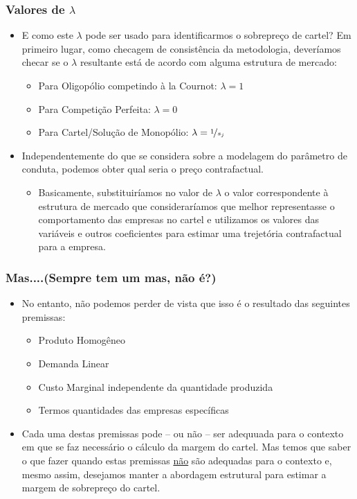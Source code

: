 \documentclass{beamer}
\begin{document}
\begin{frame}\frametitle{Valores de $\lambda$}
\small
\begin{itemize}
\item E como este $\lambda$ pode ser usado para identificarmos
o sobrepreço de cartel? Em primeiro lugar, como checagem de consistência
da metodologia, deveríamos checar se o $\lambda$ resultante está
de acordo com alguma estrutura de mercado:
\begin{itemize}
\item Para Oligopólio competindo à la Cournot: $\lambda=1$
\item Para Competição Perfeita: $\lambda=0$
\item Para Cartel/Solução de Monopólio: $\lambda=\nicefrac{1}{s_{j}}$
\end{itemize}
\item Independentemente do que se considera sobre a modelagem do
parâmetro de conduta, podemos obter qual seria o preço contrafactual.
\begin{itemize}
\item Basicamente, substituiríamos no valor de $\lambda$ o valor
correspondente à estrutura de mercado que consideraríamos que melhor
representasse o comportamento das empresas no cartel e utilizamos
os valores das variáveis e outros coeficientes para estimar uma trejetória
contrafactual para a empresa. 
\end{itemize}
\end{itemize}
\end{frame}

\begin{frame}\frametitle{Mas....(Sempre tem um mas, não é?)}

\begin{itemize}
\item No entanto, não podemos perder de vista que isso é o resultado das
seguintes premissas:

\begin{itemize}
\item Produto Homogêneo
\item Demanda Linear
\item Custo Marginal independente da quantidade produzida
\item Termos quantidades das empresas específicas
\end{itemize}
\item Cada uma destas premissas pode -- ou não --
ser adequuada para o contexto em que se faz necessário o cálculo da
margem do cartel. Mas temos que saber o que fazer quando estas premissas
\uline{não} são adequadas para o contexto e, mesmo assim, desejamos
manter a abordagem estrutural para estimar a margem de sobrepreço
do cartel. 
\end{itemize}
\end{frame}
\end{document}
